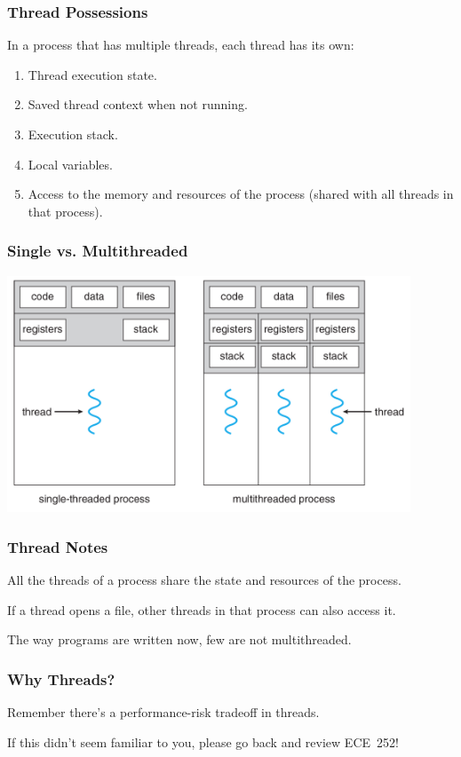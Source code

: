 \begin{frame}
	\frametitle{Thread Possessions}


	In a process that has multiple threads, each thread has its own:
	\begin{enumerate}
		\item Thread execution state.
		\item Saved thread context when not running.
		\item Execution stack.
		\item Local variables.
		\item Access to the memory and resources of the process (shared with all threads in that process).
	\end{enumerate}

\end{frame}

\begin{frame}
	\frametitle{Single vs. Multithreaded}

	\begin{center}
		\includegraphics[width=0.9\textwidth]{images/mthread2.png}
	\end{center}

\end{frame}

\begin{frame}
	\frametitle{Thread Notes}

	All the threads of a process share the state and resources of the process.

	If a thread opens a file, other threads in that process can also access it.

	The way programs are written now, few are not multithreaded.



\end{frame}

\begin{frame}
\frametitle{Why Threads?}

Remember there's a performance-risk tradeoff in threads.

If this didn't seem familiar to you, please go back and review ECE~252!

\end{frame}




